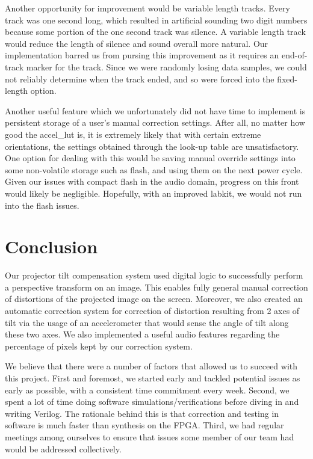 \documentclass{article}
\begin{document}
Another opportunity for improvement would be variable length tracks.
Every track was one second long, which resulted in artificial sounding two digit numbers because some portion of the one second track was silence.
A variable length track would reduce the length of silence and sound overall more natural.
Our implementation barred us from pursing this improvement as it requires an end-of-track marker for the track.
Since we were randomly losing data samples, we could not reliably determine when the track ended, and so were forced into the fixed-length option.

Another useful feature which we unfortunately did not have time to implement is persistent storage of a user's manual correction settings.
After all, no matter how good the accel\_lut is, it is extremely likely that with certain extreme orientations,
the settings obtained through the look-up table are unsatisfactory.
One option for dealing with this would be saving manual override settings into some non-volatile storage such as flash,
and using them on the next power cycle.
Given our issues with compact flash in the audio domain, progress on this front would likely be negligible.
Hopefully, with an improved labkit, we would not run into the flash issues.

\section{Conclusion}
Our projector tilt compensation system used digital logic to successfully perform a perspective transform on an image.
This enables fully general manual correction of distortions of the projected image on the screen.
Moreover, we also created an automatic correction system for correction of distortion resulting from 2 axes of tilt
via the usage of an accelerometer that would sense the angle of tilt along these two axes.
We also implemented a useful audio features regarding the percentage of pixels kept by our correction system.

We believe that there were a number of factors that allowed us to succeed with this project.
First and foremost, we started early and tackled potential issues as early as possible, with a consistent time commitment every week.
Second, we spent a lot of time doing software simulations/verifications before diving in and writing Verilog.
The rationale behind this is that correction and testing in software is much faster than synthesis on the FPGA.
Third, we had regular meetings among ourselves to ensure that issues some member of our team had would be addressed collectively.
\end{document}
